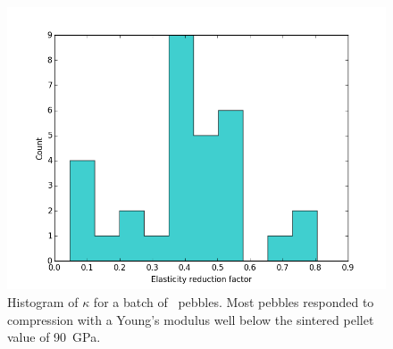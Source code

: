 \begin{figure}[!t]
\centering
    \includegraphics[width=\doubleimagewidth]{chapters/figures/fzk-kappa-histogram.png}
    \caption{Histogram of $\kappa$ for a batch of \lis~pebbles. Most pebbles responded to compression with a Young's modulus well below the sintered pellet value of \si{90 GPa}.}
    \label{fig:fzk-kappa-hist}
\end{figure}

